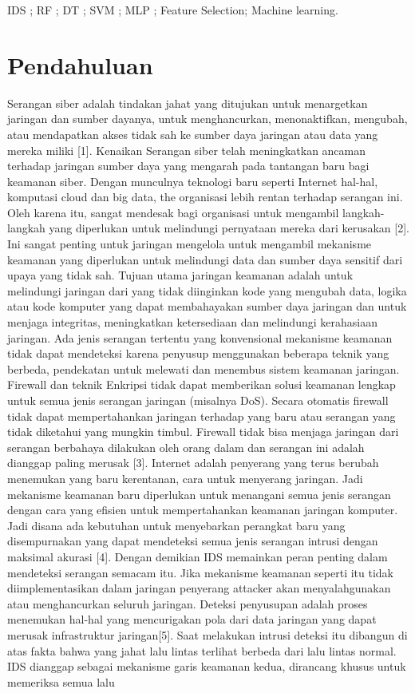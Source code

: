 \documentclass[conference]{IEEEtran}
\begin{document}
\begin{IEEEkeywords}
IDS ; RF ; DT ; SVM ; MLP ; Feature Selection; Machine learning.
\end{IEEEkeywords}

\section{Pendahuluan}
Serangan siber adalah tindakan jahat yang ditujukan untuk menargetkan jaringan dan sumber dayanya, untuk menghancurkan, menonaktifkan, mengubah, atau mendapatkan akses tidak sah ke sumber daya jaringan atau data yang mereka miliki [1]\cite{bechhofer2009owl}. Kenaikan Serangan siber telah meningkatkan ancaman terhadap jaringan sumber daya yang mengarah pada tantangan baru bagi keamanan siber. Dengan munculnya teknologi baru seperti Internet hal-hal, komputasi cloud dan big data, the organisasi lebih rentan terhadap serangan ini. Oleh karena itu, sangat mendesak bagi organisasi untuk mengambil langkah-langkah yang diperlukan untuk melindungi pernyataan mereka dari kerusakan [2]\cite{masoodi2019security}. Ini sangat penting untuk jaringan mengelola untuk mengambil mekanisme keamanan yang diperlukan untuk melindungi data dan sumber daya sensitif dari upaya yang tidak sah. Tujuan utama jaringan keamanan adalah untuk melindungi jaringan dari yang tidak diinginkan kode yang mengubah data, logika atau kode komputer yang dapat membahayakan sumber daya jaringan dan untuk menjaga integritas, meningkatkan ketersediaan dan melindungi kerahasiaan jaringan. Ada jenis serangan tertentu yang konvensional mekanisme keamanan tidak dapat mendeteksi karena penyusup menggunakan beberapa teknik yang berbeda, pendekatan untuk melewati dan menembus sistem keamanan jaringan. Firewall dan teknik Enkripsi tidak dapat memberikan solusi keamanan lengkap untuk semua jenis serangan jaringan (misalnya DoS). Secara otomatis firewall tidak dapat mempertahankan jaringan terhadap yang baru atau serangan yang tidak diketahui yang mungkin timbul. Firewall tidak bisa menjaga jaringan dari serangan berbahaya dilakukan oleh orang dalam dan serangan ini adalah dianggap paling merusak [3]\cite{ahanger2021effective}. Internet adalah penyerang yang terus berubah menemukan yang baru kerentanan, cara untuk menyerang jaringan. Jadi mekanisme keamanan baru diperlukan untuk menangani semua jenis serangan dengan cara yang efisien untuk mempertahankan keamanan jaringan komputer. Jadi disana ada kebutuhan untuk menyebarkan perangkat baru yang disempurnakan yang dapat mendeteksi semua jenis serangan intrusi dengan maksimal akurasi [4]\cite{yang2015evaluating}. Dengan demikian IDS memainkan peran penting dalam mendeteksi serangan semacam itu. Jika mekanisme keamanan seperti itu tidak diimplementasikan dalam jaringan penyerang attacker akan menyalahgunakan atau menghancurkan seluruh jaringan. Deteksi penyusupan adalah proses menemukan hal-hal yang mencurigakan pola dari data jaringan yang dapat merusak infrastruktur jaringan[5]\cite{sain1996nature}. Saat melakukan intrusi deteksi itu dibangun di atas fakta bahwa yang jahat lalu lintas terlihat berbeda dari lalu lintas normal. IDS dianggap sebagai mekanisme garis keamanan kedua, dirancang khusus untuk memeriksa semua lalu 
\end{document}
